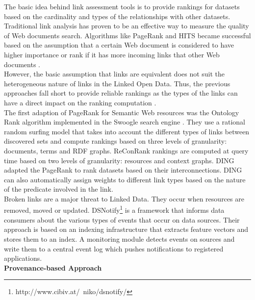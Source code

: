 \documentclass[onecolumn, crcready]{iosart2c}
\begin{document}
The basic idea behind link assessment tools is to provide rankings for datasets based on the cardinality and types of the relationships with other datasets. Traditional link analysis has proven to be an effective way to measure the quality of Web documents search. Algorithms like PageRank \cite{Lawrence981} and HITS \cite{Kleinberg:1999} became successful based on the assumption that a certain Web document is considered to have higher importance or rank if it has more incoming links that other Web documents \cite{Brin:1998}\cite{Chakrabarti99miningthe}.\\ However, the basic assumption that links are equivalent does not suit the heterogeneous nature of links in the Linked Open Data. Thus, the previous approaches fall short to provide reliable rankings as the types of the links can have a direct impact on the ranking computation \cite{Toupikov2009}.\\ The first adaption of PageRank for Semantic Web resources was the Ontology Rank algorithm implemented in the Swoogle search engine \cite{Ding2004}. They use a rational random surfing model that takes into account the different types of links between discovered sets and compute rankings based on three levels of granularity: documents, terms and RDF graphs. ReConRank \cite{Hogan06reconrank:a} rankings are computed at query time based on two levels of granularity: resources and context graphs. DING \cite{Toupikov2009} adapted the PageRank to rank datasets based on their interconnections. DING can also automatically assign weights to different link types based on the nature of the predicate involved in the link.\\Broken links are a major threat to Linked Data. They occur when resources are removed, moved or updated. DSNotify\footnote{http://www.cibiv.at/~niko/dsnotify/}\cite{cs142} is a framework that informs data consumers about the various types of events that occur on data sources. Their approach is based on an indexing infrastructure that extracts feature vectors and stores them to an index. A monitoring module detects events on sources and write them to a central event log which pushes notifications to registered applications.\\

{\bf Provenance-based Approach}\\
\end{document}
